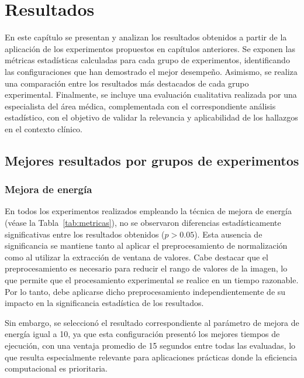 \chapter{Resultados}\label{chapter:results}

En este capítulo se presentan y analizan los resultados obtenidos a partir de la aplicación de los experimentos propuestos en capítulos anteriores. Se exponen las métricas estadísticas calculadas para cada grupo de experimentos, identificando las configuraciones que han demostrado el mejor desempeño. Asimismo, se realiza una comparación entre los resultados más destacados de cada grupo experimental. Finalmente, se incluye una evaluación cualitativa realizada por una especialista del área médica, complementada con el correspondiente análisis estadístico, con el objetivo de validar la relevancia y aplicabilidad de los hallazgos en el contexto clínico.

\section{Mejores resultados por grupos de experimentos}

\subsection{Mejora de energía}

En todos los experimentos realizados empleando la técnica de mejora de energía (véase la Tabla~\ref{tab:metricas}), no se observaron diferencias estadísticamente significativas entre los resultados obtenidos ($p > 0.05$). Esta ausencia de significancia se mantiene tanto al aplicar el preprocesamiento de normalización como al utilizar la extracción de ventana de valores. Cabe destacar que el preprocesamiento es necesario para reducir el rango de valores de la imagen, lo que permite que el procesamiento experimental se realice en un tiempo razonable. Por lo tanto, debe aplicarse dicho preprocesamiento independientemente de su impacto en la significancia estadística de los resultados.

Sin embargo, se seleccionó el resultado correspondiente al parámetro de mejora de energía igual a 10, ya que esta configuración presentó los mejores tiempos de ejecución, con una ventaja promedio de 15 segundos entre todas las evaluadas, lo que resulta especialmente relevante para aplicaciones prácticas donde la eficiencia computacional es prioritaria.

